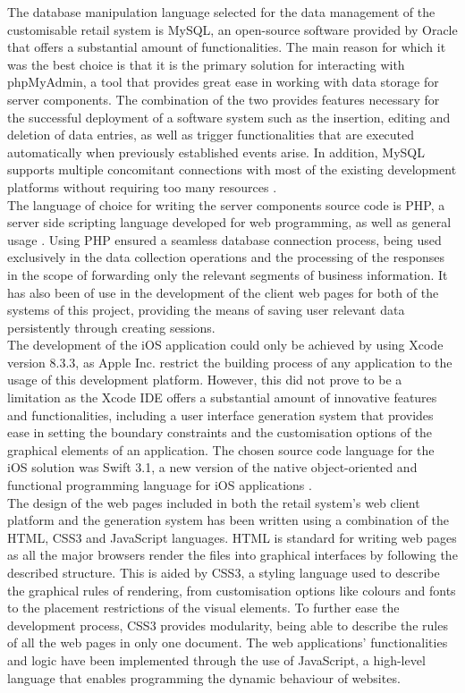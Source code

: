 The database manipulation language selected for the data management of the customisable retail system is MySQL, an open-source software provided by Oracle that offers a substantial amount of functionalities. The main reason for which it was the best choice is that it is the primary solution for interacting with phpMyAdmin, a tool that provides great ease in working with data storage for server components. The combination of the two provides features necessary for the successful deployment of a software system such as the insertion, editing and deletion of data entries, as well as trigger functionalities that are executed automatically when previously established events arise. In addition, MySQL supports multiple concomitant connections with most of the existing development platforms without requiring too many resources \cite{schifreen_2010}.\\

The language of choice for writing the server components source code is PHP, a server side scripting language developed for web programming, as well as general usage \cite{runceanu_2014}. Using PHP ensured a seamless database connection process, being used exclusively in the data collection operations and the processing of the responses in the scope of forwarding only the relevant segments of business information. It has also been of use in the development of the client web pages for both of the systems of this project, providing the means of saving user relevant data persistently through creating sessions.\\

The development of the iOS application could only be achieved by using Xcode version 8.3.3, as Apple Inc. restrict the building process of any application to the usage of this development platform. However, this did not prove to be a limitation as the Xcode IDE offers a substantial amount of innovative features and functionalities, including a user interface generation system that provides ease in setting the boundary constraints and the customisation options of the graphical elements of an application. The chosen source code language for the iOS solution was Swift 3.1, a new version of the native object-oriented and functional programming language for iOS applications \cite{swift_2014}.\\

The design of the web pages included in both the retail system's web client platform and the generation system has been written using a combination of the HTML, CSS3 and JavaScript languages. HTML is standard for writing web pages as all the major browsers render the files into graphical interfaces by following the described structure. This is aided by CSS3, a styling language used to describe the graphical rules of rendering, from customisation options like colours and fonts to the placement restrictions of the visual elements. To further ease the development process, CSS3 provides modularity, being able to describe the rules of all the web pages in only one document. The web applications' functionalities and logic have been implemented through the use of JavaScript, a high-level language that enables programming the dynamic behaviour of websites\cite{schifreen_2010}.\\

